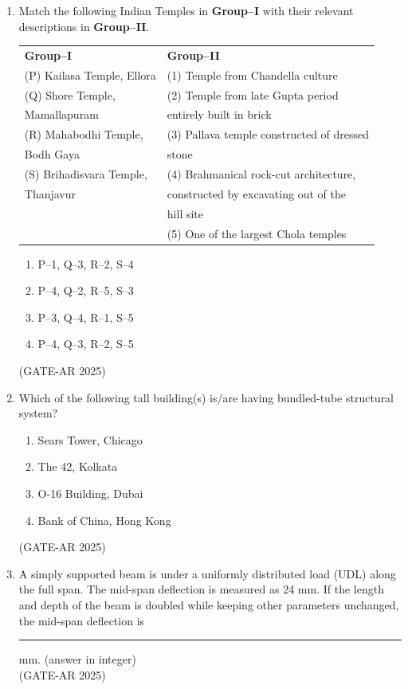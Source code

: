 \documentclass[a4paper,10pt]{article}
\begin{document}
\begin{enumerate}
\item Match the following Indian Temples in \textbf{Group–I} with their relevant descriptions in \textbf{Group–II}. \\
\begin{tabular}{ l l }
\textbf{Group–I} & \textbf{Group–II} \\
(P) Kailasa Temple, Ellora & (1) Temple from Chandella culture \\
(Q) Shore Temple, & (2) Temple from late Gupta period \\
Mamallapuram & entirely built in brick \\
(R) Mahabodhi Temple, & (3) Pallava temple constructed of dressed \\
Bodh Gaya & stone \\
(S) Brihadisvara Temple, & (4) Brahmanical rock-cut architecture, \\
Thanjavur & constructed by excavating out of the \\
& hill site \\
& (5) One of the largest Chola temples \\
\end{tabular}
\begin{multicols}{2}
\begin{enumerate}
    \item P–1, Q–3, R–2, S–4
    \item P–4, Q–2, R–5, S–3
    \item P–3, Q–4, R–1, S–5
    \item P–4, Q–3, R–2, S–5
\end{enumerate}
\end{multicols}
\hfill (GATE-AR 2025)

\item Which of the following tall building(s) is/are having bundled-tube structural system?
\begin{enumerate}
    \item Sears Tower, Chicago
    \item The 42, Kolkata
    \item O-16 Building, Dubai
    \item Bank of China, Hong Kong
\end{enumerate}
\hfill (GATE-AR 2025)

\item A simply supported beam is under a uniformly distributed load (UDL) along the full span. The mid-span deflection is measured as 24 mm. If the length and depth of the beam is doubled while keeping other parameters unchanged, the mid-span deflection is \rule{2cm}{0.4pt} mm. (answer in integer) \\
\hfill (GATE-AR 2025)


\end{enumerate}
\end{document}
